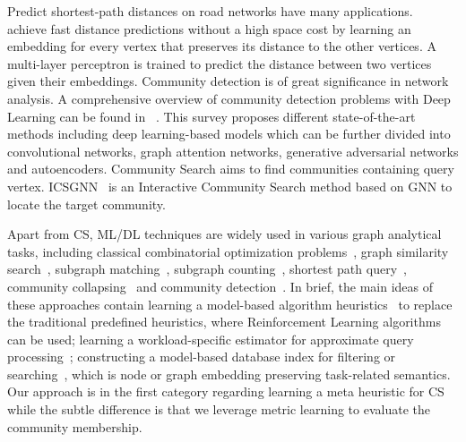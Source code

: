 {Predict shortest-path distances on road networks have many applications.
~\cite{predict} achieve fast distance predictions without a high space cost by learning an embedding for every vertex that preserves its distance to the other vertices. A multi-layer perceptron is trained to predict the distance between two vertices given their embeddings. %
Community detection is of great significance in network analysis.  A comprehensive overview of community detection problems with Deep Learning can be found in ~\cite{communitydetection}. This survey proposes different state-of-the-art methods including deep learning-based models which can be further divided into convolutional networks, graph attention networks, generative adversarial networks and autoencoders. %
Community Search aims to find communities containing query vertex. ICSGNN~\cite{ICSGNN} is an Interactive Community Search method based on GNN to locate the target community. %
}

 Apart from CS, ML/DL techniques are widely used in various graph analytical tasks, including classical combinatorial optimization problems~\cite{Combinatorial, Combinatorial2}, graph similarity search~\cite{TaGSim, GHashing, GLSearch}, subgraph matching~\cite{subiso, RLbased, NeuralSM}, subgraph counting~\cite{subgraphcounting, NSIC, zhao2023learned}, shortest path query~\cite{predict}, community collapsing~\cite{FindingCriticalUsers} and community detection~\cite{communitydetection}. 
In brief, the main ideas of these approaches contain learning a model-based algorithm heuristics~\cite{Combinatorial, Combinatorial2, GLSearch, RLbased} to replace the traditional predefined heuristics, where Reinforcement Learning algorithms can be used; learning a workload-specific estimator for approximate query processing~\cite{subgraphcounting, NSIC, TaGSim}; constructing a model-based database index for filtering or searching~\cite{subiso, NeuralSM, predict, GHashing, FindingCriticalUsers}, which is node or graph embedding preserving task-related semantics. 
Our approach is in the first category regarding learning a meta heuristic for CS while the subtle difference is that we leverage metric learning to evaluate the community membership.


